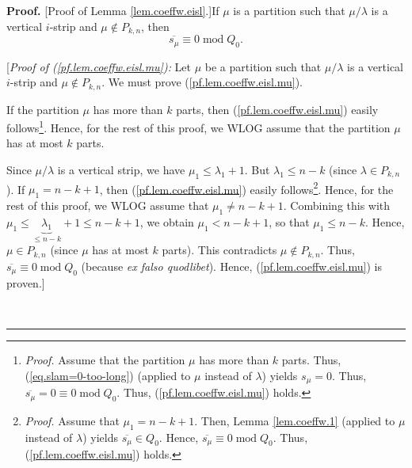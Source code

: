 \documentclass[numbers=enddot,12pt,final,onecolumn,notitlepage]{scrartcl}%
\theoremstyle{definition}
\newenvironment{proof}[1][Proof]{\noindent\textbf{#1.} }{\ \rule{0.5em}{0.5em}}
\begin{document}
\begin{proof}
[Proof of Lemma \ref{lem.coeffw.eisl}.]If $\mu$ is a partition such that
$\mu/\lambda$ is a vertical $i$-strip and $\mu\notin P_{k,n}$, then%
\begin{equation}
\overline{s_{\mu}}\equiv0\operatorname{mod}Q_{0}.
\label{pf.lem.coeffw.eisl.mu}%
\end{equation}


[\textit{Proof of (\ref{pf.lem.coeffw.eisl.mu}):} Let $\mu$ be a partition
such that $\mu/\lambda$ is a vertical $i$-strip and $\mu\notin P_{k,n}$. We
must prove (\ref{pf.lem.coeffw.eisl.mu}).

If the partition $\mu$ has more than $k$ parts, then
(\ref{pf.lem.coeffw.eisl.mu}) easily follows\footnote{\textit{Proof.} Assume
that the partition $\mu$ has more than $k$ parts. Thus,
(\ref{eq.slam=0-too-long}) (applied to $\mu$ instead of $\lambda$) yields
$s_{\mu}=0$. Thus, $\overline{s_{\mu}}=0\equiv0\operatorname{mod}Q_{0}$. Thus,
(\ref{pf.lem.coeffw.eisl.mu}) holds.}. Hence, for the rest of this proof, we
WLOG assume that the partition $\mu$ has at most $k$ parts.

Since $\mu/\lambda$ is a vertical strip, we have $\mu_{1}\leq\lambda_{1}+1$.
But $\lambda_{1}\leq n-k$ (since $\lambda\in P_{k,n}$). If $\mu_{1}=n-k+1$,
then (\ref{pf.lem.coeffw.eisl.mu}) easily follows\footnote{\textit{Proof.}
Assume that $\mu_{1}=n-k+1$. Then, Lemma \ref{lem.coeffw.1} (applied to $\mu$
instead of $\lambda$) yields $\overline{s_{\mu}}\in Q_{0}$. Hence,
$\overline{s_{\mu}}\equiv0\operatorname{mod}Q_{0}$. Thus,
(\ref{pf.lem.coeffw.eisl.mu}) holds.}. Hence, for the rest of this proof, we
WLOG assume that $\mu_{1}\neq n-k+1$. Combining this with $\mu_{1}%
\leq\underbrace{\lambda_{1}}_{\leq n-k}+1\leq n-k+1$, we obtain $\mu
_{1}<n-k+1$, so that $\mu_{1}\leq n-k$. Hence, $\mu\in P_{k,n}$ (since $\mu$
has at most $k$ parts). This contradicts $\mu\notin P_{k,n}$. Thus,
$\overline{s_{\mu}}\equiv0\operatorname{mod}Q_{0}$ (because \textit{ex falso
quodlibet}). Hence, (\ref{pf.lem.coeffw.eisl.mu}) is proven.]


\end{proof}
\end{document}
